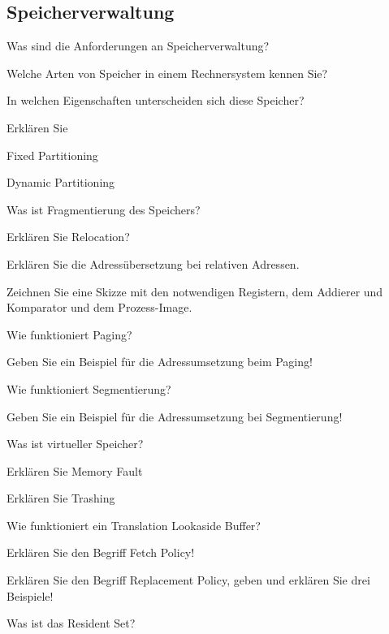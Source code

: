 \documentclass
[
  draft    = true,
  fontsize = 11pt,
  parskip  = half-,
  BCOR     = 0pt,
  DIV      = 11,
  ngerman,
  dvipsnames
]
{scrartcl}
\begin{document}
\subsection*{Speicherverwaltung}
\begin{mytemize}
  \item Was sind die Anforderungen an Speicherverwaltung?
  \item Welche Arten von Speicher in einem Rechnersystem kennen Sie?
        \begin{mytemize}
          \item In welchen Eigenschaften unterscheiden sich diese Speicher?
        \end{mytemize}
  \item Erklären Sie
        \begin{mytemize}
          \item Fixed Partitioning
          \item Dynamic Partitioning
        \end{mytemize}
  \item Was ist Fragmentierung des Speichers?
  \item Erklären Sie Relocation?
  \item Erklären Sie die Adressübersetzung bei relativen Adressen.
        \begin{mytemize}
          \item Zeichnen Sie eine Skizze mit den notwendigen Registern, dem Addierer und Komparator und dem Prozess-Image.
        \end{mytemize}
  \item Wie funktioniert Paging?
        \begin{mytemize}
          \item Geben Sie ein Beispiel für die Adressumsetzung beim Paging!
        \end{mytemize}
  \item Wie funktioniert Segmentierung?
        \begin{mytemize}
          \item Geben Sie ein Beispiel für die Adressumsetzung bei Segmentierung!
        \end{mytemize}
  \item Was ist virtueller Speicher?
        \begin{mytemize}
          \item Erklären Sie Memory Fault
          \item Erklären Sie Trashing
        \end{mytemize}
  \item Wie funktioniert ein Translation Lookaside Buffer?
  \item Erklären Sie den Begriff Fetch Policy!
  \item Erklären Sie den Begriff Replacement Policy, geben und erklären Sie drei Beispiele!
  \item Was ist das Resident Set?
\end{mytemize}
\end{document}
